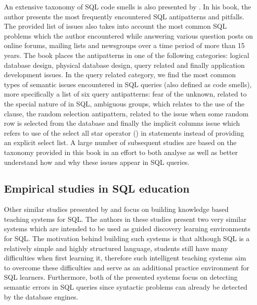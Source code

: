 An extensive taxonomy of SQL code smells is also presented by \citet{P998}. In his book, the author presents the most frequently encountered SQL antipatterns and pitfalls. The provided list of issues also takes into account the most common SQL problems which the author encountered while answering various question posts on online forums, mailing lists and newsgroups over a time period of more than 15 years. The book places the antipatterns in one of the following categories: logical database design, physical database design, query related and finally application development issues. In the query related category, we find the most common types of semantic issues encountered in SQL queries (also defined as code smells), more specifically a list of six query antipatterns: fear of the unknown, related to the special nature of  in SQL, ambiguous groups, which relates to the use of the  clause, the random selection antipattern, related to the issue when some random row is selected from the database and finally the implicit columns issue which refers to use of the select all star operator (\sql{*}) in  statements instead of providing an explicit select list. A large number of subsequent studies are based on the taxonomy provided in this book in an effort to both analyse as well as better understand how and why these issues appear in SQL queries.

\subsection{Empirical studies in SQL education}

Other similar studies presented by \citet{P004, P037, P005} and \citet{P006} focus on building knowledge based teaching systems for SQL. The authors in these studies present two very similar systems which are intended to be used as guided discovery learning environments for SQL. The motivation behind building such systems is that although SQL is a relatively simple and highly structured language, students still have many difficulties when first learning it, therefore such intelligent teaching systems aim to overcome these difficulties and serve as an additional practice environment for SQL learners. Furthermore, both of the presented systems focus on detecting semantic errors in SQL queries since syntactic problems can already be detected by the database engines. 

